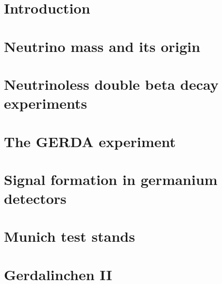 \documentclass[11pt,a4paper]{book}
\begin{document}
\pagestyle{empty}



\cleardoublepage



\cleardoublepage \setcounter{page}{1} 

\tableofcontents

\cleardoublepage \setcounter{page}{1} 

\pagestyle{headings}

\chapter{Introduction}
\label{cha:intro}

\clearpage{\pagestyle{empty}\cleardoublepage}

\chapter{Neutrino mass and its origin}
\label{cha:theory}

\clearpage{\pagestyle{empty}\cleardoublepage}

\chapter{Neutrinoless double beta decay experiments}
\label{cha:exps}

\clearpage{\pagestyle{empty}\cleardoublepage}

\chapter{The GERDA experiment}
\label{cha:gerda}

\clearpage{\pagestyle{empty}\cleardoublepage}

\chapter{Signal formation in germanium detectors}
\label{cha:detector}

\clearpage{\pagestyle{empty}\cleardoublepage}

\chapter{Munich test stands}
\label{cha:teststand}

\clearpage{\pagestyle{empty}\cleardoublepage}

\chapter{Gerdalinchen II}
\label{cha:gerdalinchenII}

\clearpage{\pagestyle{empty}\cleardoublepage}
\end{document}
